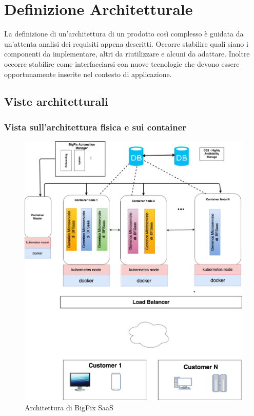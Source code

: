\section{Definizione Architetturale}
La definizione di un'architettura di un prodotto così complesso è guidata da un'attenta analisi dei requisiti appena descritti. Occorre stabilire quali siano i componenti da implementare, altri da riutilizzare e alcuni da adattare. Inoltre occorre stabilire come interfacciarsi con nuove tecnologie che devono essere opportunamente inserite nel contesto di applicazione.

\subsection{Viste architetturali}
\subsubsection{Vista sull'architettura fisica e sui container}
\begin{figure} [h!]
	\centering
	\includegraphics[width=1\linewidth]{capitoli/imgs/BfsaasArchitecture.png}
	\caption{Architettura di BigFix SaaS}
	\label{fig:arch}
\end{figure}
